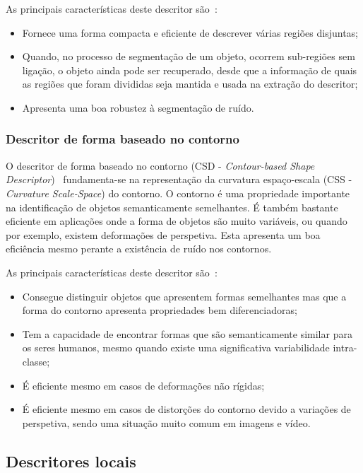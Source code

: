 As principais características deste descritor são~\cite{Bober2001}:

\begin{itemize}
\item Fornece uma forma compacta e eficiente de descrever várias regiões disjuntas;
\item Quando, no processo de segmentação de um objeto, ocorrem sub-regiões sem ligação, o objeto ainda pode ser recuperado, desde que a informação de quais as regiões que foram divididas seja mantida e usada na extração do descritor;
\item Apresenta uma boa robustez à segmentação de ruído.
\end{itemize}

\subsubsection{Descritor de forma baseado no contorno}

O descritor de forma baseado no contorno (CSD - \textit{Contour-based Shape Descriptor})~\cite{Bober2001} fundamenta-se na representação da curvatura espaço-escala (CSS - \textit{Curvature Scale-Space}) do contorno. O contorno é uma propriedade importante na identificação de objetos semanticamente semelhantes. É também bastante eficiente em aplicações onde a forma de objetos são muito variáveis, ou quando por exemplo, existem deformações de perspetiva. Esta apresenta um boa eficiência mesmo perante a existência de ruído nos contornos. 

As principais características deste descritor são~\cite{Bober2001}: 

\begin{itemize}
\item Consegue distinguir objetos que apresentem formas semelhantes mas que a forma do contorno apresenta propriedades bem diferenciadoras;
\item Tem a capacidade de encontrar formas que são semanticamente similar para os seres humanos, mesmo quando existe uma significativa variabilidade intra-classe;
\item É eficiente mesmo em casos de deformações não rígidas;
\item É eficiente mesmo em casos de distorções do contorno devido a variações de perspetiva, sendo uma situação muito comum em imagens e vídeo.
\end{itemize}

\subsection{Descritores locais}

